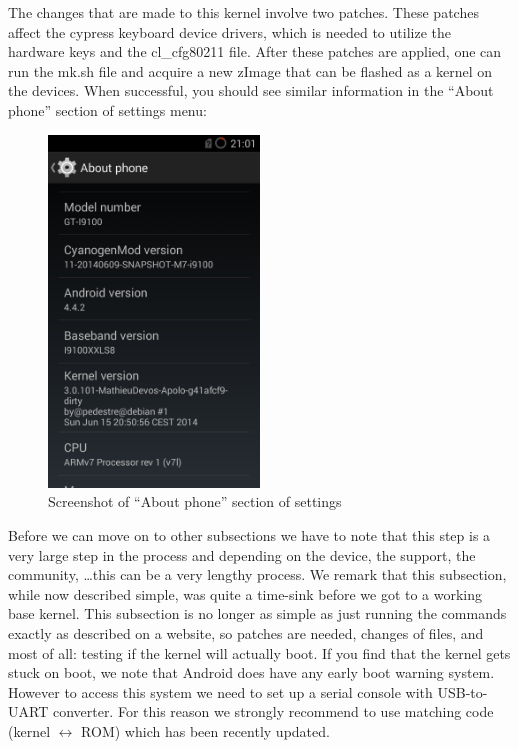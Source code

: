 The changes that are made to this kernel involve two patches. These patches affect the cypress keyboard device drivers, which is needed to utilize the hardware keys and the cl\_cfg80211 file. After these patches are applied, one can run the mk.sh file and acquire a new zImage that can be flashed as a kernel on the devices. When successful, you should see similar information in the ``About phone'' section of settings menu:
\npar
\begin{figure}[H]
    \centering
    \includegraphics[width=0.5\textwidth]{figures/screenshot-kernel-i9100}
    \caption{Screenshot of ``About phone'' section of settings} 
    \label{fig:screenshot-kernel-i9100}
\end{figure}

\npar

Before we can move on to other subsections we have to note that this step is a very large step in the process and depending on the device, the support, the community, \ldots this can be a very lengthy process. We remark that this subsection, while now described simple, was quite a time-sink before we got to a working base kernel. This subsection is no longer as simple as just running the commands exactly as described on a website, so patches are needed, changes of files, and most of all: testing if the kernel will actually boot. If you find that the kernel gets stuck on boot, we note that Android does have any early boot warning system. However to access this system we need to set up a serial console with USB-to-UART converter. For this reason we strongly recommend to use matching code (kernel $\leftrightarrow$ ROM) which has been recently updated. 

